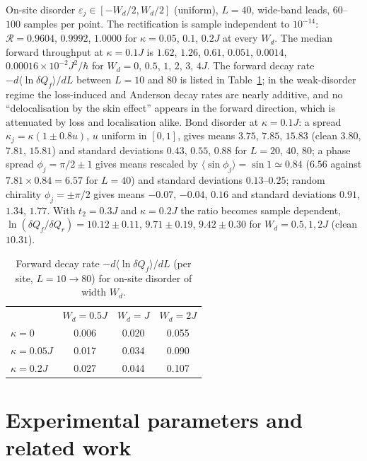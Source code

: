 \documentclass[aps,prl,superscriptaddress,nofootinbib,onecolumn,notitlepage,11pt]{revtex4-2}
\newcommand{\R}{\mathcal{R}}
\newcommand{\dQ}{\delta Q}
\begin{document}
On-site disorder $\varepsilon_j\in[-W_d/2,W_d/2]$ (uniform), $L=40$, wide-band leads, $60$--$100$ samples per point. The rectification is sample independent to $10^{-14}$: $\R=0.9604$, $0.9992$, $1.0000$ for $\kappa=0.05$, $0.1$, $0.2J$ at every $W_d$. The median forward throughput at $\kappa=0.1J$ is $1.62$, $1.26$, $0.61$, $0.051$, $0.0014$, $0.00016\times10^{-2}J^2/\hbar$ for $W_d=0$, $0.5$, $1$, $2$, $3$, $4J$. The forward decay rate $-d\langle\ln\dQ_f\rangle/dL$ between $L=10$ and $80$ is listed in Table~\ref{tab:decay}; in the weak-disorder regime the loss-induced and Anderson decay rates are nearly additive, and no ``delocalisation by the skin effect'' appears in the forward direction, which is attenuated by loss and localisation alike. Bond disorder at $\kappa=0.1J$: a spread $\kappa_j=\kappa(1\pm0.8u)$, $u$ uniform in $[0,1]$, gives means $3.75$, $7.85$, $15.83$ (clean $3.80$, $7.81$, $15.81$) and standard deviations $0.43$, $0.55$, $0.88$ for $L=20$, $40$, $80$; a phase spread $\phi_j=\pi/2\pm1$ gives means rescaled by $\langle\sin\phi_j\rangle=\sin1\simeq0.84$ ($6.56$ against $7.81\times0.84=6.57$ for $L=40$) and standard deviations $0.13$--$0.25$; random chirality $\phi_j=\pm\pi/2$ gives means $-0.07$, $-0.04$, $0.16$ and standard deviations $0.91$, $1.34$, $1.77$. With $t_2=0.3J$ and $\kappa=0.2J$ the ratio becomes sample dependent, $\ln(\dQ_f/\dQ_r)=10.12\pm0.11$, $9.71\pm0.19$, $9.42\pm0.30$ for $W_d=0.5,1,2J$ (clean $10.31$).

\begin{table}[h]
\caption{Forward decay rate $-d\langle\ln\dQ_f\rangle/dL$ (per site, $L=10\to80$) for on-site disorder of width $W_d$.}
\label{tab:decay}
\begin{ruledtabular}
\begin{tabular}{lccc}
 & $W_d=0.5J$ & $W_d=J$ & $W_d=2J$ \\
\colrule
$\kappa=0$ & 0.006 & 0.020 & 0.055 \\
$\kappa=0.05J$ & 0.017 & 0.034 & 0.090 \\
$\kappa=0.2J$ & 0.027 & 0.044 & 0.107 \\
\end{tabular}
\end{ruledtabular}
\end{table}

\section{Experimental parameters and related work}
\label{sec:exp}
\end{document}
